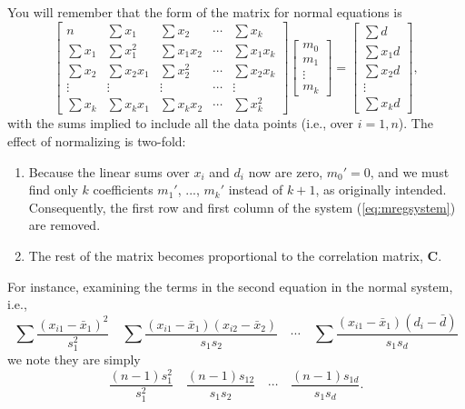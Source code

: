 You will remember that the form of the matrix for normal equations is
\begin{equation}
\left [ \begin{array}{ccccc}
n &  \sum x_1 &  \sum x_2 & \cdots &  \sum x_k \\[5pt]
 \sum x_1 &  \sum x^2_1 & \sum x_1 x_2 & \cdots &  \sum x_1 x_k \\[5pt]
 \sum x_2 &  \sum x_2 x_1 & \sum x^2_2 & \cdots &  \sum x_2 x_k \\[5pt]
\vdots & \vdots & \vdots & \cdots & \vdots \\[5pt]
 \sum x_k &  \sum x_k x_1  & \sum x_k x_2 & \cdots &  \sum x^2_k 
\end{array} \right ] 
\left [ \begin{array}{c}
m_0\\ m_1\\ \vdots \\ m_k \end{array} \right ]  = 
\left [
\begin{array}{c}
 \sum d \\[5pt]  \sum x_1 d \\[5pt]  \sum x_2 d \\[5pt] \vdots \\[5pt] \sum x_k d
\end{array} \right ] ,
\label{eq:mregsystem}
\end{equation}
with the sums implied to include all the data points (i.e., over $i = 1,n$).
The effect of normalizing is two-fold:
\begin{enumerate}
\item	Because the linear sums over $x_i$ and $d_i$ now are zero, $m_0' = 0$, and we must find only $k$ coefficients $m_1'$, ..., $m_k'$ instead of $k + 1$, as originally 
intended.  Consequently, the first row and first column of the system (\ref{eq:mregsystem}) are removed.
\item	The rest of the matrix becomes proportional to the correlation matrix, $\mathbf{C}$.
\end{enumerate}
For instance, examining the terms in the second equation in the normal system, i.e.,
\begin{equation}
\sum \frac{(x_{i1} - \bar{x}_1) ^2}{s^2_1} \quad \sum \frac{(x_{i1} - \bar{x}_1) (x_{i2} - \bar{x}_2)}{s_1s_2} \quad \cdots \quad \sum 
\frac{(x_{i1} - \bar{x}_1)(d_i - \bar{d})}{s_1s_d}
\end{equation}	 
we note they are simply
\begin{equation}
\frac{(n-1)s^2_1}{s^2_1}  \quad \frac{(n-1)s_{12}}{s_1 s_2} \quad \cdots \quad \frac{(n-1)s_{1d}}{s_1 s_d}.
\end{equation}	 
